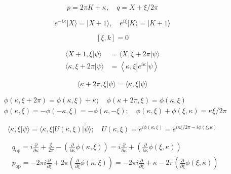 \documentclass[main.tex]{subfiles}
\begin{document}
\begin{equation}\label{16.6}
	p=2 \pi K+\kappa, \quad q=X+\xi / 2 \pi
\end{equation}

\begin{equation}\label{16.7}
	e^{-i \kappa}|X\rangle=|X+1\rangle, \quad e^{i \xi}|K\rangle=|K+1\rangle
\end{equation}

\begin{equation}\label{16.8}
	[\xi,k] = 0
\end{equation}

\begin{equation}\label{16.9}
	\begin{aligned}
\langle X+1, \xi | \psi\rangle &=\langle X, \xi+2 \pi | \psi\rangle \\
\langle\kappa, \xi+ 2 \pi | \psi\rangle &=\left\langle\kappa, \xi\left|e^{i \kappa}\right| \psi\right\rangle
\end{aligned}
\end{equation}

\begin{equation}\label{16.10}
	\langle\kappa+ 2 \pi, \xi | \psi\rangle=\langle\kappa, \xi | \psi\rangle
\end{equation}

\begin{equation}\label{16.11}
	\begin{aligned}
&\phi(\kappa, \xi+2 \pi)=\phi(\kappa, \xi)+\kappa ; \quad \phi(\kappa+2 \pi, \xi)=\phi(\kappa, \xi)\\
&\phi(\kappa, \xi)=-\phi(-\kappa, \xi)=-\phi(\kappa,-\xi) ; \quad \phi(\kappa, \xi)+\phi(\xi, \kappa)=\kappa \xi / 2 \pi
\end{aligned}
\end{equation}

\begin{equation}\label{16.13}
	\langle\kappa, \xi | \psi\rangle=\langle\kappa, \xi|U(\kappa, \xi)| \tilde{\psi}\rangle ; \quad U(\kappa, \xi)=e^{i \phi(\kappa, \xi)}=e^{i \kappa \xi / 2 \pi-i \phi(\xi, \kappa)}
\end{equation}

\begin{equation}\label{16.14}
	\begin{aligned}
&q_{\mathrm{op}}=i \frac{\partial}{\partial \kappa}+\frac{\xi}{2 \pi}-\left(\frac{\partial}{\partial \kappa} \phi(\kappa, \xi)\right)=i \frac{\partial}{\partial \kappa}+\left(\frac{\partial}{\partial \kappa} \phi(\xi, \kappa)\right)\\
&p_{\mathrm{op}}=-2 \pi i \frac{\partial}{\partial \xi}+2 \pi\left(\frac{\partial}{\partial \xi} \phi(\kappa, \xi)\right)=-2 \pi i \frac{\partial}{\partial \xi}+\kappa-2 \pi\left(\frac{\partial}{\partial \xi} \phi(\xi, \kappa)\right)
\end{aligned}
\end{equation}
\end{document}
